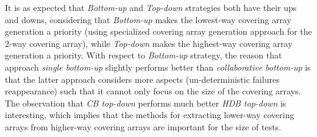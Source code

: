 \documentclass[conference]{IEEEtran}
\theoremstyle{definition}
\begin{document}
It is as expected that \emph{Bottom-up} and \emph{Top-down} strategies both have their ups and downs, considering that \emph{Bottom-up} makes the lowest-way covering array generation a priority (using specialized covering array generation approach for the 2-way covering array), while \emph{Top-down} makes the highest-way covering array generation a priority.  With respect to \emph{Bottom-up} strategy, the reason that approach \emph{single bottom-up} slightly performs better than \emph{collaborative bottom-up} is that the latter approach considers more aspects (un-deterministic failures reappearance) such that it cannot only focus on the size of the covering arrays.  The observation that \emph{CB top-down} performs much better \emph{HDB top-down} is interesting, which implies that the methods for extracting lower-way  covering arrays from higher-way covering arrays are important for the size of tests.



\end{document}
